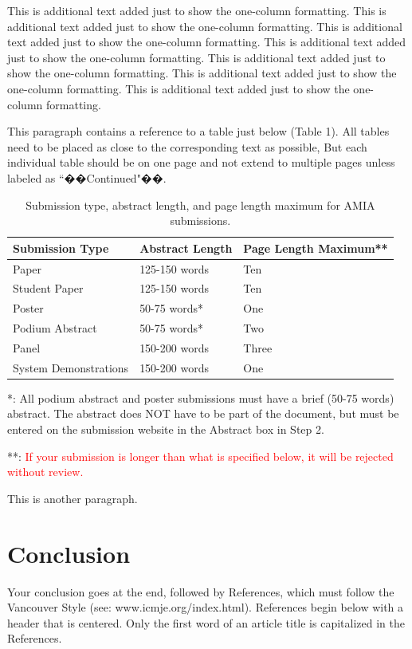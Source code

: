 \documentclass{amia}
\begin{document}
This is additional text added just to show the one-column formatting.  This is additional text added just to show the one-column formatting.  This is additional text added just to show the one-column formatting.  This is additional text added just to show the one-column formatting.  This is additional text added just to show the one-column formatting.  This is additional text added just to show the one-column formatting.  This is additional text added just to show the one-column formatting.

This paragraph contains a reference to a table just below (Table 1).  All tables need to be placed as close to the corresponding text as possible, But each individual table should be on one page and not extend to multiple pages unless labeled as ``��Continued"��.

\begin{table}[h]
\centering
\caption{Submission type, abstract length, and page length maximum for AMIA submissions.}
  \begin{tabular}{|l|l|l|}
  \hline
    \textbf{Submission Type}    & \textbf{Abstract Length}  & \textbf{Page Length Maximum**} \\ \hline
    Paper  & 125-150 words  & Ten   \\ \hline
    Student Paper  & 125-150 words  & Ten \\ \hline
    Poster  &50-75 words*   & One \\ \hline
    Podium  Abstract & 50-75 words*  & Two \\ \hline
    Panel   &150-200 words  & Three \\ \hline
    System Demonstrations    &150-200 words  & One \\ \hline
  \end{tabular}
\end{table}
*: All podium abstract and poster submissions must have a brief (50-75 words) abstract. The abstract does NOT have to be part of the document, but must be entered on the submission website in the Abstract box in Step 2.

**: \textcolor{red}{If your submission is longer than what is specified below, it will be rejected without review.}

This is another paragraph.

\section*{Conclusion}
Your conclusion goes at the end, followed by References, which must follow the Vancouver Style (see: www.icmje.org/index.html).  References begin below with a header that is centered.  Only the first word of an article title is capitalized in the References. 
\end{document}
